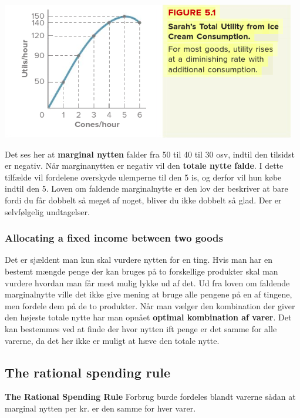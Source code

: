 \includegraphics[scale=0.8]{Afsnit/Lektion2/Sarahkoberis.png}

Det ses her at \textbf{marginal nytten} falder fra 50 til 40 til 30 osv, indtil den tilsidst er negativ. Når marginanytten er negativ vil den \textbf{totale nytte falde}. I dette tilfælde vil fordelene overskyde ulemperne til den 5 is, og derfor vil hun købe indtil den 5. Loven om faldende marginalnytte er den lov der beskriver at bare fordi du får dobbelt så meget af noget, bliver du ikke dobbelt så glad. Der er selvfølgelig undtagelser. 

\subsubsection{Allocating a fixed income between two goods}
Det er sjældent man kun skal vurdere nytten for en ting. Hvis man har en bestemt mængde penge der kan bruges på to forskellige produkter skal man vurdere hvordan man får mest mulig lykke ud af det. Ud fra loven om faldende marginalnytte ville det ikke give mening at bruge alle pengene på en af tingene, men fordele dem på de to produkter. Når man vælger den kombination der giver den højeste totale nytte har man opnået \textbf{optimal kombination af varer}. Det kan bestemmes ved at finde der hvor nytten ift penge er det samme for alle varerne, da det her ikke er muligt at hæve den totale nytte. 

\subsection{The rational spending rule}
\begin{defn}\textbf{The Rational Spending Rule} %
\newline
Forbrug burde fordeles blandt varerne sådan at marginal nytten per kr. er den samme for hver varer. 
\end{defn}

